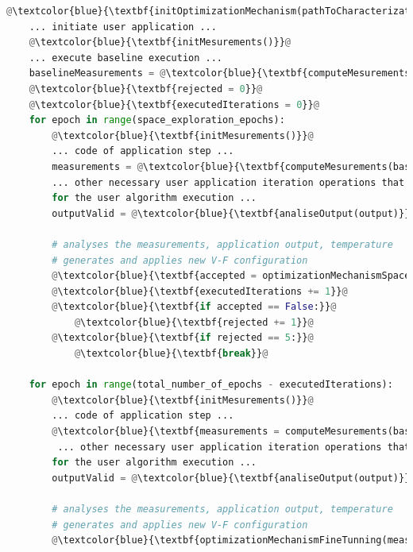 \begin{lstlisting}[language=Python, caption=Usage example of the V-F Optimization Mechanism Library. Blue statements represents the added programming elements for the mechanism, label=lst:wrapper, basicstyle=\footnotesize\ttfamily,abovecaptionskip=0pt, captionpos=b,escapechar=@]
    @\textcolor{blue}{\textbf{initOptimizationMechanism(pathToCharacterizationResults)}}@
    ... initiate user application ...
    @\textcolor{blue}{\textbf{initMesurements()}}@
    ... execute baseline execution ...
    baselineMeasurements = @\textcolor{blue}{\textbf{computeMesurements()}}@
    @\textcolor{blue}{\textbf{rejected = 0}}@
    @\textcolor{blue}{\textbf{executedIterations = 0}}@
    for epoch in range(space_exploration_epochs):
        @\textcolor{blue}{\textbf{initMesurements()}}@
        ... code of application step ...
        measurements = @\textcolor{blue}{\textbf{computeMesurements(baselineMeasurements)}}@
        ... other necessary user application iteration operations that do not account
        for the user algorithm execution ...
        outputValid = @\textcolor{blue}{\textbf{analiseOutput(output)}}@
        
        # analyses the measurements, application output, temperature
        # generates and applies new V-F configuration
        @\textcolor{blue}{\textbf{accepted = optimizationMechanismSpaceExploration(measurements, outputValid)}}@
        @\textcolor{blue}{\textbf{executedIterations += 1}}@
        @\textcolor{blue}{\textbf{if accepted == False:}}@
            @\textcolor{blue}{\textbf{rejected += 1}}@
        @\textcolor{blue}{\textbf{if rejected == 5:}}@
            @\textcolor{blue}{\textbf{break}}@
    
    for epoch in range(total_number_of_epochs - executedIterations):
        @\textcolor{blue}{\textbf{initMesurements()}}@
        ... code of application step ...
        @\textcolor{blue}{\textbf{measurements = computeMesurements(baselineMeasurements)}}@
         ... other necessary user application iteration operations that do not account
        for the user algorithm execution ...
        outputValid = @\textcolor{blue}{\textbf{analiseOutput(output)}}@
        
        # analyses the measurements, application output, temperature
        # generates and applies new V-F configuration
        @\textcolor{blue}{\textbf{optimizationMechanismFineTunning(measurements, outputValid)}}@
\end{lstlisting}





